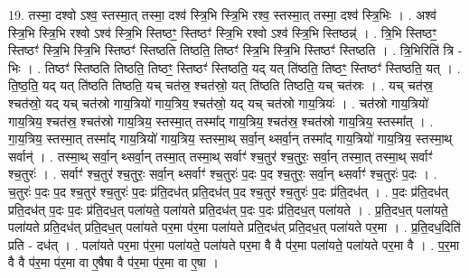 \documentclass[17pt]{extarticle}
\begin{document}
19. तस्मा॒ दश्वो ऽश्व॒ स्तस्मा॒त् तस्मा॒ दश्व॑ स्त्रि॒भि स्त्रि॒भि रश्व॒ स्तस्मा॒त् तस्मा॒ दश्व॑ स्त्रि॒भिः । . अश्व॑ स्त्रि॒भि स्त्रि॒भि रश्वो ऽश्व॑ स्त्रि॒भि स्तिष्ठꣳ॒॒ स्तिष्ठꣳ॑ स्त्रि॒भि रश्वो ऽश्व॑ स्त्रि॒भि स्तिष्ठन्न्॑ । . त्रि॒भि स्तिष्ठꣳ॒॒ स्तिष्ठꣳ॑ स्त्रि॒भि स्त्रि॒भि स्तिष्ठꣳ॑ स्तिष्ठति तिष्ठति॒ तिष्ठꣳ॑ स्त्रि॒भि स्त्रि॒भि स्तिष्ठꣳ॑ स्तिष्ठति । . त्रि॒भिरिति॑ त्रि - भिः । . तिष्ठꣳ॑ स्तिष्ठति तिष्ठति॒ तिष्ठꣳ॒॒ स्तिष्ठꣳ॑ स्तिष्ठति॒ यद् यत् ति॑ष्ठति॒ तिष्ठꣳ॒॒ स्तिष्ठꣳ॑ स्तिष्ठति॒ यत् । . ति॒ष्ठ॒ति॒ यद् यत् ति॑ष्ठति तिष्ठति॒ यच् चत॑स्र॒ श्चत॑स्रो॒ यत् ति॑ष्ठति तिष्ठति॒ यच् चत॑स्रः । . यच् चत॑स्र॒ श्चत॑स्रो॒ यद् यच् चत॑स्रो गाय॒त्रियो॑ गाय॒त्रिय॒ श्चत॑स्रो॒ यद् यच् चत॑स्रो गाय॒त्रियः॑ । . चत॑स्रो गाय॒त्रियो॑ गाय॒त्रिय॒ श्चत॑स्र॒ श्चत॑स्रो गाय॒त्रिय॒ स्तस्मा॒त् तस्मा᳚द् गाय॒त्रिय॒ श्चत॑स्र॒ श्चत॑स्रो गाय॒त्रिय॒ स्तस्मा᳚त् । . गा॒य॒त्रिय॒ स्तस्मा॒त् तस्मा᳚द् गाय॒त्रियो॑ गाय॒त्रिय॒ स्तस्मा॒थ् सर्वा॒न् थ्सर्वा॒न् तस्मा᳚द् गाय॒त्रियो॑ गाय॒त्रिय॒ स्तस्मा॒थ् सर्वान्॑ । . तस्मा॒थ् सर्वा॒न् थ्सर्वा॒न् तस्मा॒त् तस्मा॒थ् सर्वाꣳ॑ श्च॒तुर॑ श्च॒तुरः॒ सर्वा॒न् तस्मा॒त् तस्मा॒थ् 
सर्वाꣳ॑ श्च॒तुरः॑ । . सर्वाꣳ॑ श्च॒तुर॑ श्च॒तुरः॒ सर्वा॒न् थ्सर्वाꣳ॑ श्च॒तुरः॑ प॒दः प॒द श्च॒तुरः॒ सर्वा॒न् 
थ्सर्वाꣳ॑ श्च॒तुरः॑ प॒दः । . च॒तुरः॑ प॒दः प॒द श्च॒तुर॑ श्च॒तुरः॑ प॒दः प्र॑ति॒दध॑त् प्रति॒दध॑त् प॒द श्च॒तुर॑ श्च॒तुरः॑ प॒दः प्र॑ति॒दध॑त् । . प॒दः प्र॑ति॒दध॑त् प्रति॒दध॑त् प॒दः प॒दः प्र॑ति॒दध॒त् पला॑यते॒ पला॑यते प्रति॒दध॑त् प॒दः प॒दः प्र॑ति॒दध॒त् पला॑यते । . प्र॒ति॒दध॒त् पला॑यते॒ पला॑यते प्रति॒दध॑त् प्रति॒दध॒त् पला॑यते पर॒मा प॑र॒मा पला॑यते प्रति॒दध॑त् प्रति॒दध॒त् पला॑यते पर॒मा । . प्र॒ति॒दध॒दिति॑ प्रति - दध॑त् । . पला॑यते पर॒मा प॑र॒मा पला॑यते॒ पला॑यते पर॒मा वै वै प॑र॒मा पला॑यते॒ पला॑यते पर॒मा वै । . प॒र॒मा वै वै प॑र॒मा प॑र॒मा वा ए॒षैषा वै प॑र॒मा प॑र॒मा वा ए॒षा । \newline
\end{document}
